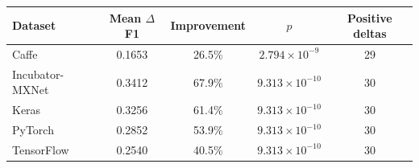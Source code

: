 \begin{tabular}{lcccc}
\toprule
Dataset & Mean $\Delta$F1 & Improvement & $p$ & Positive deltas \\
\midrule
Caffe & 0.1653 & 26.5\% & $2.794 \times 10^{-9}$ & 29 \\
Incubator-MXNet & 0.3412 & 67.9\% & $9.313 \times 10^{-10}$ & 30 \\
Keras & 0.3256 & 61.4\% & $9.313 \times 10^{-10}$ & 30 \\
PyTorch & 0.2852 & 53.9\% & $9.313 \times 10^{-10}$ & 30 \\
TensorFlow & 0.2540 & 40.5\% & $9.313 \times 10^{-10}$ & 30 \\
\bottomrule
\end{tabular}